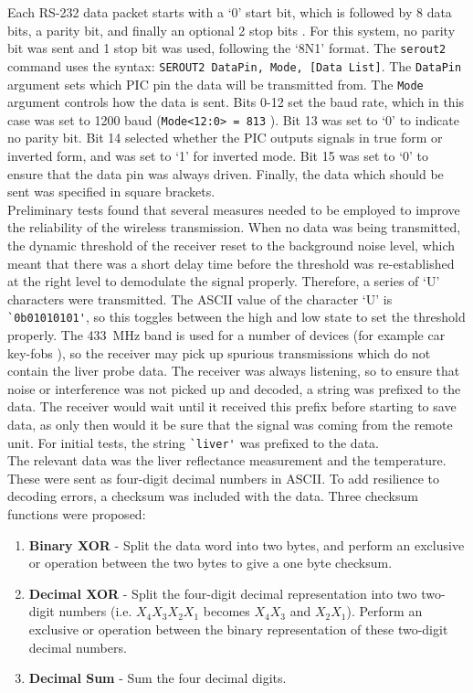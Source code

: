 Each RS-232 data packet starts with a `0' start bit, which is followed by 8 data bits, a parity bit, and finally an optional 2 stop bits \cite{rs232}. For this system, no parity bit was sent and 1 stop bit was used, following the `8N1' format. The \verb|serout2| command uses the syntax: \verb|SEROUT2 DataPin, Mode, [Data List]|. The \verb|DataPin| argument sets which PIC pin the data will be transmitted from. The \verb|Mode| argument controls how the data is sent. Bits 0-12 set the baud rate, which in this case was set to 1200 baud (\verb|Mode<12:0> = 813| \cite{picbasic_pro}). Bit 13 was set to `0' to indicate no parity bit. Bit 14 selected whether the PIC outputs signals in true form or inverted form, and was set to `1' for inverted mode. Bit 15 was set to `0' to ensure that the data pin was always driven. Finally, the data which should be sent was specified in square brackets.\\

Preliminary tests found that several measures needed to be employed to improve the reliability of the wireless transmission. When no data was being transmitted, the dynamic threshold of the receiver reset to the background noise level, which meant that there was a short delay time before the threshold was re-established at the right level to demodulate the signal properly. Therefore, a series of `U' characters were transmitted. The ASCII value of the character `U' is \verb|`0b01010101'|, so this toggles between the high and low state to set the threshold properly. The \SI{433}{\mega\hertz} band is used for a number of devices (for example car key-fobs \cite{qam-rx}), so the receiver may pick up spurious transmissions which do not contain the liver probe data. The receiver was always listening, so to ensure that noise or interference was not picked up and decoded, a string was prefixed to the data. The receiver would wait until it received this prefix before starting to save data, as only then would it be sure that the signal was coming from the remote unit. For initial tests, the string \verb|`liver'| was prefixed to the data. \\

The relevant data was the liver reflectance measurement and the temperature. These were sent as four-digit decimal numbers in ASCII. To add resilience to decoding errors, a checksum was included with the data. Three checksum functions were proposed:
\begin{enumerate}
\item \label{check: binary xor} \textbf{Binary XOR} - Split the data word into two bytes, and perform an exclusive or operation between the two bytes to give a one byte checksum.
\item \label{check: decimal xor} \textbf{Decimal XOR} - Split the four-digit decimal representation into two two-digit numbers (i.e. $X_4X_3X_2X_1$ becomes $X_4X_3$ and $X_2X_1$). Perform an exclusive or operation between the binary representation of these two-digit decimal numbers.
\item \label{check: decimal sum} \textbf{Decimal Sum} - Sum the four decimal digits.
\end{enumerate}

